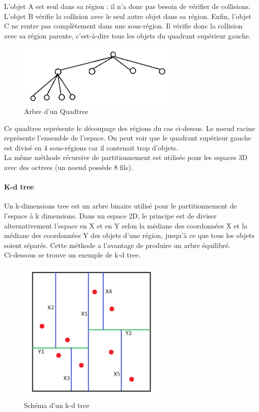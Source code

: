 \documentclass{report}
\begin{document}
L’objet A est seul dans sa région : il n’a donc pas besoin de vérifier de collisions. L’objet B vérifie la collision avec le seul autre objet dans sa région. Enfin, l’objet C ne rentre pas complètement dans une sous-région. Il vérifie donc la collision avec sa région parente, c’est-à-dire tous les objets du quadrant supérieur gauche.

\begin{figure}[H]
\centering
\includegraphics[scale=0.6]{arbre_quadtree.PNG}
\caption{Arbre d'un Quadtree}
\end{figure}

Ce quadtree représente le découpage des régions du cas ci-dessus. Le noeud racine représente l’ensemble de l’espace. On peut voir que le quadrant supérieur gauche est divisé en 4 sous-régions car il contenait trop d’objets. \\

La même méthode récursive de partitionnement est utilisée pour les espaces 3D avec des octrees (un noeud possède 8 fils).

\paragraph{K-d tree}

Un k-dimensions tree est un arbre binaire utilisé pour le partitionnement de l’espace à k dimensions. Dans un espace 2D, le principe est de diviser alternativement l’espace en X et en Y selon la médiane des coordonnées X et la médiane des coordonnées Y des objets d’une région, jusqu’à ce que tous les objets soient séparés. Cette méthode a l’avantage de produire un arbre équilibré. \\

Ci-dessous se trouve un exemple de k-d tree.

\begin{figure}[H]
\centering
\includegraphics[scale=0.6]{kdtree.png}
\caption{Schéma d'un k-d tree}
\end{figure}
\end{document}
